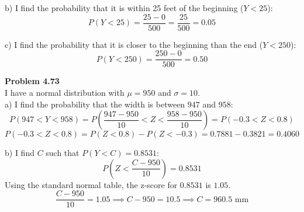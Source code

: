 \documentclass[11pt]{article}
\begin{document}
\noindent b) I find the probability that it is within 25 feet of the beginning ($Y < 25$):
\[ P(Y < 25) = \frac{25 - 0}{500} = \frac{25}{500} = 0.05 \]

\noindent c) I find the probability that it is closer to the beginning than the end ($Y < 250$):
\[ P(Y < 250) = \frac{250 - 0}{500} = 0.50 \]

\vspace{0.5cm}
\noindent \textbf{Problem 4.73} \\
I have a normal distribution with $\mu = 950$ and $\sigma = 10$.
\\
a) I find the probability that the width is between $947$ and $958$:
\[ P(947 < Y < 958) = P\left(\frac{947 - 950}{10} < Z < \frac{958 - 950}{10}\right) = P(-0.3 < Z < 0.8) \]
\[ P(-0.3 < Z < 0.8) = P(Z < 0.8) - P(Z < -0.3) = 0.7881 - 0.3821 = 0.4060 \]

\noindent b) I find $C$ such that $P(Y < C) = 0.8531$:
\[ P\left(Z < \frac{C - 950}{10}\right) = 0.8531 \]
Using the standard normal table, the z-score for $0.8531$ is $1.05$.
\[ \frac{C - 950}{10} = 1.05 \implies C - 950 = 10.5 \implies C = 960.5 \text{ mm} \]
\end{document}
